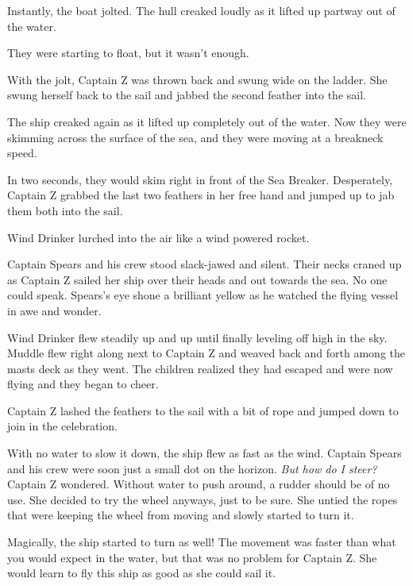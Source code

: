 \documentclass[12pt]{extbook}
\begin{document}
  Instantly, the boat jolted. The hull creaked loudly as it lifted up
  partway out of the water.
  
  They were starting to float, but it wasn't enough.
  
  With the jolt, Captain Z was thrown back and swung wide on the ladder.
  She swung herself back to the sail and jabbed the second feather into
  the sail.
  
  The ship creaked again as it lifted up completely out of the water. Now
  they were skimming across the surface of the sea, and they were moving
  at a breakneck speed.
  
  In two seconds, they would skim right in front of the Sea Breaker.
  Desperately, Captain Z grabbed the last two feathers in her free hand
  and jumped up to jab them both into the sail.
  
  Wind Drinker lurched into the air like a wind powered rocket.
  
  Captain Spears and his crew stood slack-jawed and silent. Their necks
  craned up as Captain Z sailed her ship over their heads and out towards
  the sea. No one could speak. Spears's eye shone a brilliant yellow as he
  watched the flying vessel in awe and wonder.
  
  Wind Drinker flew steadily up and up until finally leveling off high in
  the sky. Muddle flew right along next to Captain Z and weaved back and
  forth among the masts deck as they went. The children realized they had
  escaped and were now flying and they began to cheer.
  
  Captain Z lashed the feathers to the sail with a bit of rope and jumped
  down to join in the celebration.
  
  With no water to slow it down, the ship flew as fast as the wind.
  Captain Spears and his crew were soon just a small dot on the horizon.
  \emph{But how do I steer?} Captain Z wondered. Without water to push
  around, a rudder should be of no use. She decided to try the wheel
  anyways, just to be sure. She untied the ropes that were keeping the
  wheel from moving and slowly started to turn it.
  
  Magically, the ship started to turn as well! The movement was faster
  than what you would expect in the water, but that was no problem for
  Captain Z. She would learn to fly this ship as good as she could sail
  it.
  
  \section{}\label{section-39}
  
\end{document}
